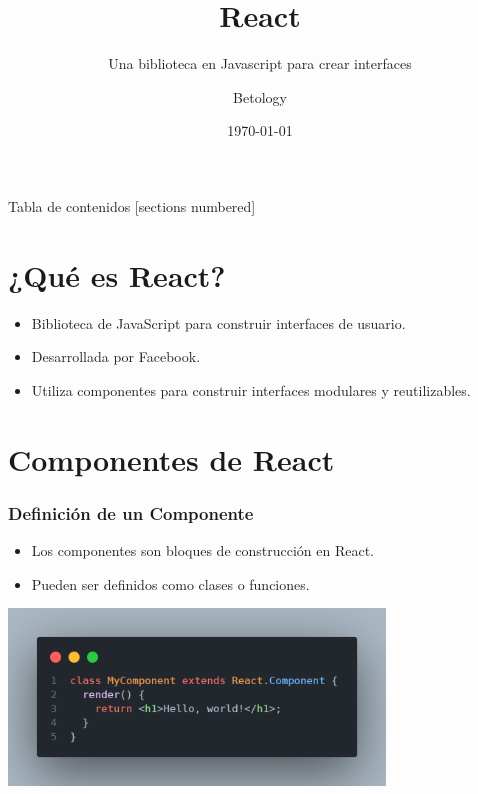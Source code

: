 \documentclass[10pt]{beamer}
\title{React}
\subtitle{Una biblioteca en Javascript para crear interfaces}
\date{\today}
\author{Betology}
\institute{Amor, comprensión y ternura}
\begin{document}
\maketitle

\begin{frame}{Tabla de contenidos}
  [sections numbered]
  \tableofcontents[hideallsubsections]
\end{frame}

\section{¿Qué es React?}

\begin{frame}

  \begin{itemize}
    \item Biblioteca de JavaScript para construir interfaces de usuario.
    \item Desarrollada por Facebook.
    \item Utiliza componentes para construir interfaces modulares y reutilizables.
  \end{itemize}
\end{frame}

\section{Componentes de React}

\begin{frame}[fragile]
  \frametitle{Definición de un Componente}
  \begin{itemize}
    \item Los componentes son bloques de construcción en React.
    \item Pueden ser definidos como clases o funciones.
  \end{itemize}
    \includegraphics[width=100mm,scale=0.25]{myComponent.png}
\end{frame}
\end{document}
